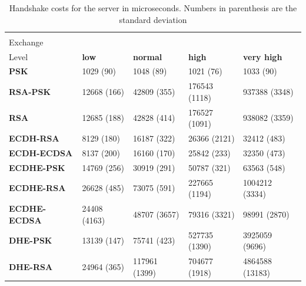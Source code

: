 				\begin{table}[]
				  \begin{tabular}{|l|l|l|l|l|}
				  \hline
				   \backslashbox{Key\\Exchange}{Security\\Level}                    & \textbf{low} & \textbf{normal} & \textbf{high} & \textbf{very high} \\ \hline
				  \textbf{PSK}         & 1029 (90)     & 1048 (89)        & 1021 (76)      & 1033 (90)           \\ \hline
				  \textbf{RSA-PSK}     & 12668 (166)   & 42809 (355)      & 176543 (1118)  & 937388 (3348)       \\ \hline
				  \textbf{RSA}         & 12685 (188)   & 42828 (414)      & 176527 (1091)  & 938082 (3359)       \\ \hline
				  \textbf{ECDH-RSA}    & 8129 (180)    & 16187 (322)      & 26366 (2121)   & 32412 (483)         \\ \hline
				  \textbf{ECDH-ECDSA}  & 8137 (200)    & 16160 (170)      & 25842 (233)    & 32350 (473)         \\ \hline
				  \textbf{ECDHE-PSK}   & 14769 (256)   & 30919 (291)      & 50787 (321)    & 63563 (548)         \\ \hline
				  \textbf{ECDHE-RSA}   & 26628 (485)   & 73075 (591)      & 227665 (1194)  & 1004212 (3334)      \\ \hline
				  \textbf{ECDHE-ECDSA} & 24408 (4163)  & 48707 (3657)     & 79316 (3321)   & 98991 (2870)        \\ \hline
				  \textbf{DHE-PSK}     & 13139 (147)   & 75741 (423)      & 527735 (1390)  & 3925059 (9696)      \\ \hline
				  \textbf{DHE-RSA}     & 24964 (365)   & 117961 (1399)    & 704677 (1918)  & 4864588 (13183)     \\ \hline
				  \end{tabular}
				  \caption{Handshake costs for the server in microseconds. Numbers in parenthesis are the standard deviation}
				  \label{table:server-hs-costs-papi}
				  \end{table}
				  
